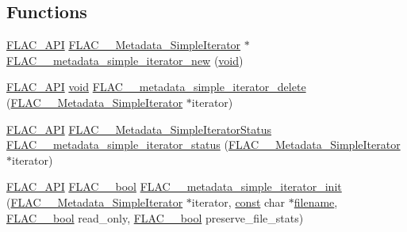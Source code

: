 \subsection*{Functions}
\begin{DoxyCompactItemize}
\item 
\hyperlink{group__flac__export_ga56ca07df8a23310707732b1c0007d6f5}{F\+L\+A\+C\+\_\+\+A\+PI} \hyperlink{struct_f_l_a_c_____metadata___simple_iterator}{F\+L\+A\+C\+\_\+\+\_\+\+Metadata\+\_\+\+Simple\+Iterator} $\ast$ \hyperlink{group__flac__metadata__level1_ga5b32f4eba211e05727428e9080f4e393}{F\+L\+A\+C\+\_\+\+\_\+metadata\+\_\+simple\+\_\+iterator\+\_\+new} (\hyperlink{sound_8c_ae35f5844602719cf66324f4de2a658b3}{void})
\item 
\hyperlink{group__flac__export_ga56ca07df8a23310707732b1c0007d6f5}{F\+L\+A\+C\+\_\+\+A\+PI} \hyperlink{sound_8c_ae35f5844602719cf66324f4de2a658b3}{void} \hyperlink{group__flac__metadata__level1_ga46e64734300a022bb9616b26228b0348}{F\+L\+A\+C\+\_\+\+\_\+metadata\+\_\+simple\+\_\+iterator\+\_\+delete} (\hyperlink{struct_f_l_a_c_____metadata___simple_iterator}{F\+L\+A\+C\+\_\+\+\_\+\+Metadata\+\_\+\+Simple\+Iterator} $\ast$iterator)
\item 
\hyperlink{group__flac__export_ga56ca07df8a23310707732b1c0007d6f5}{F\+L\+A\+C\+\_\+\+A\+PI} \hyperlink{group__flac__metadata__level1_gac926e7d2773a05066115cac9048bbec9}{F\+L\+A\+C\+\_\+\+\_\+\+Metadata\+\_\+\+Simple\+Iterator\+Status} \hyperlink{group__flac__metadata__level1_ga68cfafa2323154f3ee1d3061eafe109f}{F\+L\+A\+C\+\_\+\+\_\+metadata\+\_\+simple\+\_\+iterator\+\_\+status} (\hyperlink{struct_f_l_a_c_____metadata___simple_iterator}{F\+L\+A\+C\+\_\+\+\_\+\+Metadata\+\_\+\+Simple\+Iterator} $\ast$iterator)
\item 
\hyperlink{group__flac__export_ga56ca07df8a23310707732b1c0007d6f5}{F\+L\+A\+C\+\_\+\+A\+PI} \hyperlink{ordinals_8h_a95103469f1cbd78b8cf250194985b34e}{F\+L\+A\+C\+\_\+\+\_\+bool} \hyperlink{group__flac__metadata__level1_ga2a055cca4e6e06ae62517c8b0fa6e8a3}{F\+L\+A\+C\+\_\+\+\_\+metadata\+\_\+simple\+\_\+iterator\+\_\+init} (\hyperlink{struct_f_l_a_c_____metadata___simple_iterator}{F\+L\+A\+C\+\_\+\+\_\+\+Metadata\+\_\+\+Simple\+Iterator} $\ast$iterator, \hyperlink{getopt1_8c_a2c212835823e3c54a8ab6d95c652660e}{const} char $\ast$\hyperlink{test__portburn_8cpp_a7efa5e9c7494c7d4586359300221aa5d}{filename}, \hyperlink{ordinals_8h_a95103469f1cbd78b8cf250194985b34e}{F\+L\+A\+C\+\_\+\+\_\+bool} read\+\_\+only, \hyperlink{ordinals_8h_a95103469f1cbd78b8cf250194985b34e}{F\+L\+A\+C\+\_\+\+\_\+bool} preserve\+\_\+file\+\_\+stats)

\end{DoxyCompactItemize}

